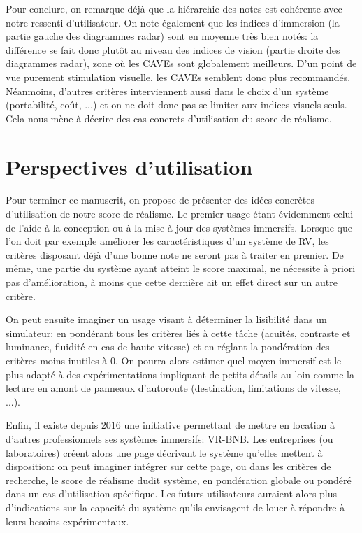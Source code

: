 \par Pour conclure, on remarque déjà que la hiérarchie des notes est cohérente avec notre ressenti d'utilisateur. On note également que les indices d'immersion (la partie gauche des diagrammes radar) sont en moyenne très bien notés: la différence se fait donc plutôt au niveau des indices de vision (partie droite des diagrammes radar), zone où les CAVEs sont globalement meilleurs. D'un point de vue purement stimulation visuelle, les CAVEs semblent donc plus recommandés. Néanmoins, d'autres critères interviennent aussi dans le choix d'un système (portabilité, coût, ...) et on ne doit donc pas se limiter aux indices visuels seuls. Cela nous mène à décrire des cas concrets d'utilisation du score de réalisme.

\section*{Perspectives d'utilisation}
\par Pour terminer ce manuscrit, on propose de présenter des idées concrètes d'utilisation de notre score de réalisme. Le premier usage étant évidemment celui de l'aide à la conception ou à la mise à jour des systèmes immersifs. Lorsque que l'on doit par exemple améliorer les caractéristiques d'un système de RV, les critères disposant déjà d'une bonne note ne seront pas à traiter en premier. De même, une partie du système ayant atteint le score maximal, ne nécessite à priori pas d'amélioration, à moins que cette dernière ait un effet direct sur un autre critère.

\par On peut ensuite imaginer un usage visant à déterminer la lisibilité dans un simulateur: en pondérant tous les critères liés à cette tâche (acuités, contraste et luminance, fluidité en cas de haute vitesse) et en réglant la pondération des critères moins inutiles à 0. On pourra alors estimer quel moyen immersif est le plus adapté à des expérimentations impliquant de petits détails au loin comme la lecture en amont de panneaux d'autoroute (destination, limitations de vitesse, ...).

\par Enfin, il existe depuis 2016 une initiative permettant de mettre en location à d'autres professionnels ses systèmes immersifs: VR-BNB. Les entreprises (ou laboratoires) créent alors une page décrivant le système qu'elles mettent à disposition: on peut imaginer intégrer sur cette page, ou dans les critères de recherche, le score de réalisme dudit système, en pondération globale ou pondéré dans un cas d'utilisation spécifique. Les futurs utilisateurs auraient alors plus d'indications sur la capacité du système qu'ils envisagent de louer à répondre à leurs besoins expérimentaux.
